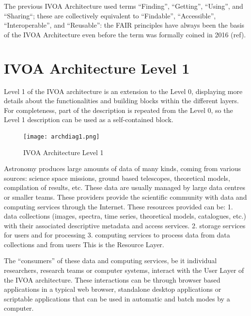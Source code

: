 \documentclass[11pt,a4paper]{ivoa}
\begin{document}
The previous IVOA Architecture used terms ``Finding'', ``Getting'', ``Using'', and ``Sharing``;
these are collectively equivalent to ``Findable'', ``Accessible'', ``Interoperable'', and
``Reusable'': the FAIR principles have always been the basis of the IVOA Architecture
even before the term was formally coined in 2016 (ref).

\section{IVOA Architecture Level 1}

Level 1 of the IVOA architecture is an extension to the Level 0, displaying more 
details about the functionalities and building blocks within the different layers. 
For completeness, part of the description is repeated  from  the  Level 0, so the  
Level 1 description can be used as a self-contained block.

\begin{figure}[h]
\centering
\texttt{[image: archdiag1.png]}
\caption{IVOA Architecture Level 1}
\label{fig:architecture1}
\end{figure}

Astronomy produces large amounts of data of many kinds, coming from various sources:  
science  space  missions, ground  based telescopes, theoretical models, compilation  
of results, etc. These  data are usually managed by large data centres or 
smaller teams. These providers provide the scientific community with data and
computing services through the Internet. These resources provided can be:  
1. data collections (images, spectra, time series, theoretical  models, catalogues, etc.)  
with their associated descriptive metadata and access services.  
2. storage services for users and for processing 
3. computing services to process data from data collections and from users
This is the Resource Layer. 

The ``consumers''  of  these data and computing services, be it individual researchers,
research teams or computer systems, interact with the User Layer of the IVOA architecture.
These interactions can be through browser based applications in a typical web browser,
standalone desktop applications or scriptable applications that can be used in automatic 
and batch modes by a computer. 
\end{document}
